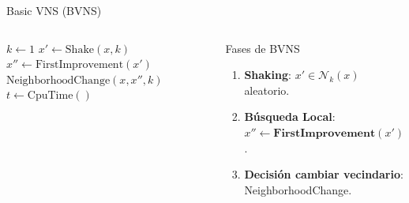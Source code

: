 \documentclass[aspectratio=169, 11pt, xcolor={dvipsnames,table}]{beamer}
\newcommand{\naranja}[1]{\textcolor{UsachNaranja}{#1}}
\begin{document}

\begin{frame}{Basic VNS (BVNS)}

\begin{columns}[T]
\scriptsize
\begin{algorithm}[H]
\caption{VNS$(x, k_{\max}, t_{\max})$}
\begin{algorithmic}[1]
\Repeat
  \State $k \gets 1$
  \Repeat
    \State $x' \gets \text{Shake}(x, k)$
    \State $x'' \gets \text{FirstImprovement}(x')$
    \State $\text{NeighborhoodChange}(x, x'', k)$
  \State $t \gets \text{CpuTime}()$
\end{algorithmic}
\end{algorithm}

\center
\begin{alertblock}{Fases de BVNS}
\begin{enumerate}
  \item \textbf{Shaking}: $x' \in \mathcal{N}_k(x)$ aleatorio.
  \item \textbf{Búsqueda Local}: \naranja{$x'' \gets \textbf{FirstImprovement}(x')$} .
  \item \textbf{Decisión cambiar vecindario}: NeighborhoodChange.
\end{enumerate}
\end{alertblock}
\end{columns}

\end{frame}





\end{document}

